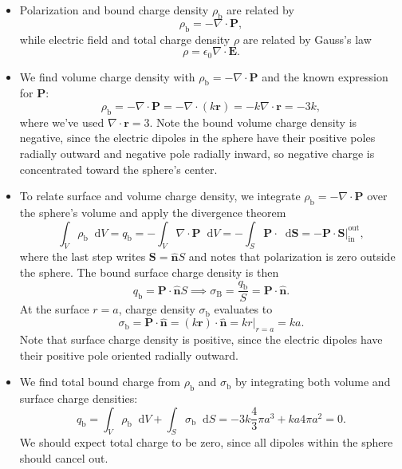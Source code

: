 \documentclass[11pt, a4paper]{article}
\newcommand{\diff}{\mathop{}\!\mathrm{d}} %
\renewcommand{\vec}[1]{\bm{#1}} %
\newcommand{\uvec}[1]{\hat{\vec{#1}}} %
\renewcommand{\r}{\vec{r}}
\newcommand{\E}{\vec{E}}  %
\newcommand{\ee}{\epsilon_{0}}  %
\renewcommand{\P}{\vec{P}}  %
\renewcommand{\div}{\nabla \cdot}
\begin{document}
\begin{itemize}
	\item Polarization and bound charge density $ \rho_{\text{b}} $ are related by
	\begin{equation*}
		\rho_{\text{b}} = - \div \P,
	\end{equation*}
	while electric field and total charge density $ \rho $ are related by Gauss's law
	\begin{equation*}
		\rho = \ee \div \E.
	\end{equation*}
	
	\item We find volume charge density with $ \rho_{\text{b}} = - \div \P $ and the known expression for $ \P $:
	\begin{equation*}
		\rho_{\text{b}} = - \div \P = - \div (k \r) = -k \div \r = - 3k,
	\end{equation*}
	where we've used $ \div \r = 3 $. Note the bound volume charge density is negative, since the electric dipoles in the sphere have their positive poles radially outward and negative pole radially inward, so negative charge is concentrated toward the sphere's center.

	
	\item To relate surface and volume charge density, we integrate $ \rho_{\text{b}} = - \div \P $ over the sphere's volume and apply the divergence theorem
	\begin{equation*}
		\int_{V} \rho_{\text{b}}\diff V = q_{\text{b}} = - \int_{V}\div \P \diff V = - \int_{S}\P \cdot \diff \vec{S} = - \P \cdot \vec{S} \big |_{\text{in}}^{\text{out}},
	\end{equation*}
	where the last step writes $ \vec{S} = \uvec{n}S $ and notes that polarization is zero outside the sphere. The bound surface charge density is then
	\begin{equation*}
		q_{\text{b}} = \P \cdot \uvec{n} S \implies \sigma_{\text{B}} = \frac{q_{\text{b}}}{S} = \P \cdot \uvec{n}.
	\end{equation*}
	At the surface $ r = a $, charge density $ \sigma_{\text{b}} $ evaluates to
	\begin{equation*}
		\sigma_{\text{b}} = \P \cdot \uvec{n} = (k \r) \cdot \uvec{n} = k r \big |_{r = a}  = k a.
	\end{equation*}
	Note that surface charge density is positive, since the electric dipoles have their positive pole oriented radially outward. 
	
	\item We find total bound charge from $ \rho_{\text{b}} $ and $ \sigma_{\text{b}} $ by integrating both volume and surface charge densities:
	\begin{equation*}
		q_{\text{b}} = \int_{V} \rho_{\text{b}} \diff V + \int_{S} \sigma_{\text{b}} \diff S = - 3k \frac{4}{3}\pi a^{3} + ka 4\pi a^{2} = 0.
	\end{equation*} 
	We should expect total charge to be zero, since all dipoles within the sphere should cancel out.
\end{itemize}	
	
\end{document}

